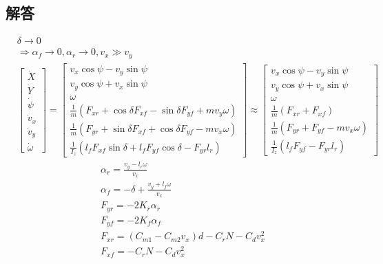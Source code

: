 \documentclass[UTF8]{ctexart}
\begin{document}
  \subsection{解答}
  $$
\begin{aligned}
&\delta \rightarrow 0 \\
&\Rightarrow \alpha_{f} \rightarrow 0, \alpha_{r} \rightarrow 0, v_{x} \gg v_{y} \\
&{\left[\begin{array}{c}
\dot{X} \\
\dot{Y} \\
\dot{\psi} \\
\dot{v}_{x} \\
\dot{v}_{y} \\
\dot{\omega}
\end{array}\right]=\left[\begin{array}{c}
v_{x} \cos \psi-v_{y} \sin \psi \\
v_{y} \cos \psi+v_{x} \sin \psi \\
\omega \\
\frac{1}{m}\left(F_{x r}+\cos \delta F_{x f}-\sin \delta F_{y f}+m v_{y} \omega\right) \\
\frac{1}{m}\left(F_{y r}+\sin \delta F_{x f}+\cos \delta F_{y f}-m v_{x} \omega\right) \\
\frac{1}{I_{z}}\left(l_{f} F_{x f} \sin \delta+l_{f} F_{y f} \cos \delta-F_{y r} l_{r}\right)
\end{array}\right] \approx\left[\begin{array}{c}
v_{x} \cos \psi-v_{y} \sin \psi \\
v_{y} \cos \psi+v_{x} \sin \psi \\
\omega \\
\frac{1}{m}\left(F_{x r}+F_{x f}\right) \\
\frac{1}{m}\left(F_{y r}+F_{y f}-m v_{x} \omega\right) \\
\frac{1}{I_{z}}\left(l_{f} F_{y f}-F_{y r} l_{r}\right)
\end{array}\right]}
\end{aligned}
$$
$$
\begin{aligned}
&\alpha_{r}=\frac{v_{y}-l_{r} \omega}{v_{x}} \\
&\alpha_{f}=-\delta+\frac{v_{y}+l_{f} \omega}{v_{x}} \\
&F_{y r}=-2 K_{r} \alpha_{r} \\
&F_{y f}=-2 K_{f} \alpha_{f} \\
&F_{x r}=\left(C_{m 1}-C_{m 2} v_{x}\right) d-C_{r} N-C_{d} v_{x}^{2} \\
&F_{x f}=-C_{r} N-C_{d} v_{x}^{2}
\end{aligned}
$$
\end{document}

